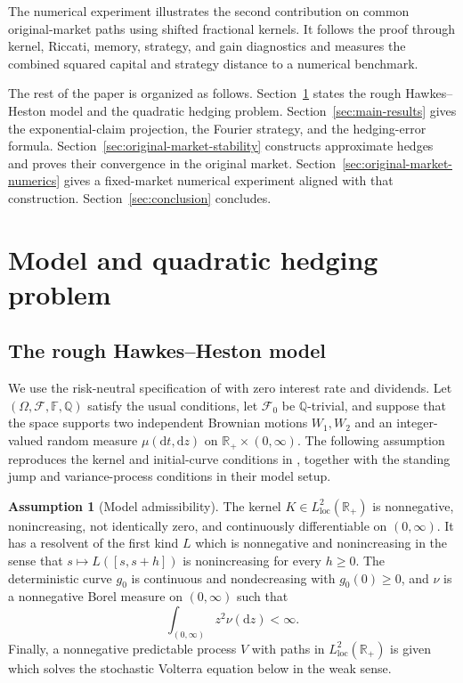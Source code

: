 \documentclass[11pt]{article}
\theoremstyle{definition}
\newtheorem{assumption}[theorem]{Assumption}
\theoremstyle{remark}
\newcommand{\R}{\mathbb{R}}
\newcommand{\Q}{\mathbb{Q}}
\newcommand{\F}{\mathcal{F}}
\newcommand{\1}{\mathbf{1}}
\newcommand{\dd}{\mathrm{d}}
\begin{document}
The numerical experiment illustrates the second contribution on common
original-market paths using shifted fractional kernels. It follows the
proof through kernel, Riccati, memory, strategy, and gain diagnostics and
measures the combined squared capital and strategy distance to a numerical
benchmark.

The rest of the paper is organized as follows. Section~\ref{sec:model} states
the rough Hawkes--Heston model and the quadratic hedging problem.
Section~\ref{sec:main-results} gives the exponential-claim projection, the
Fourier strategy, and the hedging-error formula.
Section~\ref{sec:original-market-stability} constructs approximate hedges
and proves their convergence in the original market.
Section~\ref{sec:original-market-numerics} gives a fixed-market numerical
experiment aligned with that construction.
Section~\ref{sec:conclusion} concludes.


\section{Model and quadratic hedging problem}
\label{sec:model}

\subsection{The rough Hawkes--Heston model}

We use the risk-neutral specification of \citet{bondi2024} with zero interest
rate and dividends. Let $(\Omega,\F,\mathbb F,\Q)$ satisfy the usual
conditions, let $\F_0$ be $\Q$-trivial, and suppose that the space supports two
independent Brownian motions $W_1,W_2$ and an
integer-valued random measure $\mu(\dd t,\dd z)$ on
$\R_+\times(0,\infty)$. The following assumption reproduces the kernel and
initial-curve conditions in \citet[Hypotheses~2.1--2.2]{bondi2024}, together
with the standing jump and variance-process conditions in their model setup.

\begin{assumption}[Model admissibility]
\label{ass:model}
The kernel $K\in L^2_{\mathrm{loc}}(\R_+)$ is nonnegative, nonincreasing,
not identically zero, and continuously differentiable on $(0,\infty)$. It has
a resolvent of the first kind $L$ which is nonnegative and nonincreasing in
the sense that $s\mapsto L([s,s+h])$ is nonincreasing for every $h\geq0$.
The deterministic curve $g_0$ is continuous and nondecreasing with
$g_0(0)\geq0$, and $\nu$ is a nonnegative Borel measure on $(0,\infty)$ such
that
\[
 \int_{(0,\infty)}z^2\nu(\dd z)<\infty.
\]
Finally, a nonnegative predictable process $V$ with paths in
$L^2_{\mathrm{loc}}(\R_+)$ is given which solves the stochastic Volterra
equation below in the weak sense.
\end{assumption}
\end{document}
